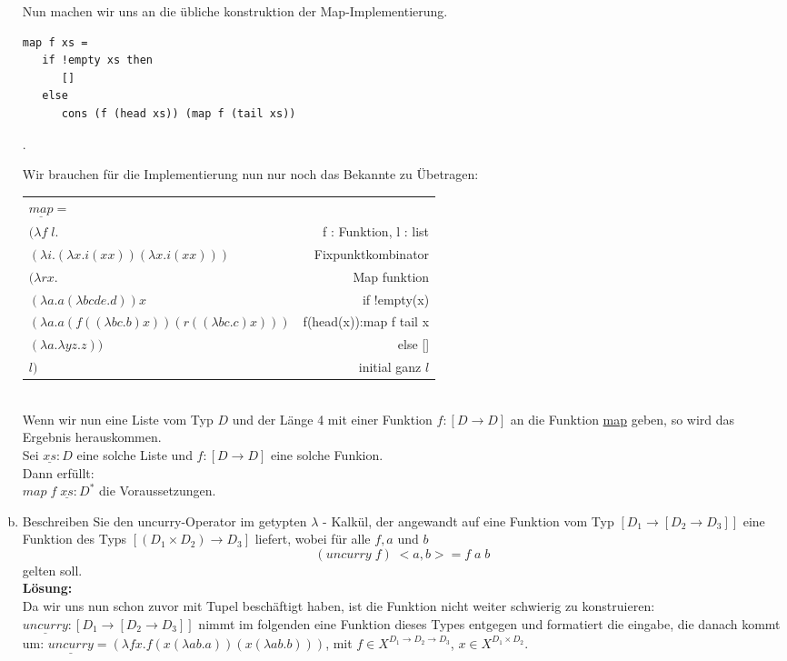 \documentclass[11pt,a4paper,ngerman]{article}
\begin{document}
\begin{enumerate}[(a)]
      Nun machen wir uns an die übliche konstruktion der Map-Implementierung.
      \begin{lstlisting}
map f xs =
   if !empty xs then
      []
   else
      cons (f (head xs)) (map f (tail xs))
      \end{lstlisting}.

      Wir brauchen für die Implementierung nun nur noch das Bekannte zu Übetragen:\\
      \begin{tabular}{lr}
         $\underline{map} =$ &\\
         $ (\lambda f \; l.$& f : Funktion, l : list\\
         $(\lambda i.(\lambda x.i(xx)) (\lambda x.i(xx)))$& Fixpunktkombinator\\   
         $(\lambda rx.$&Map funktion\\
         $(\lambda a.a(\lambda bcde.d))x$& if !empty(x)\\
         $(\lambda a.a (f((\lambda bc.b)x)) (r((\lambda bc.c)x)))$& f(head(x)):map f tail x\\
         $(\lambda a. \lambda yz.z))$& else []\\
         $l)$& initial ganz $l$
      \end{tabular}\\
      
      Wenn wir nun eine Liste vom Typ $D$ und der Länge 4 mit einer Funktion $f:[D\rightarrow D]$
      an die Funktion \underline{map} geben, so wird das Ergebnis herauskommen.\\

      Sei $\underline{xs} : D$ eine solche Liste und $f : [D \rightarrow D]$ eine solche Funkion.\\
      Dann erfüllt:\\
      $map \;f\; \underline{xs} : D^*$ die Voraussetzungen.

\pagebreak

	\item Beschreiben Sie den uncurry-Operator im getypten $\lambda$ - Kalkül, der angewandt
      auf eine Funktion vom Typ $[D_1 \rightarrow [D_2 \rightarrow D_3]]$ eine Funktion des
      Typs $[(D_1 \times D_2) \rightarrow D_3]$ liefert, wobei für alle $f, a$ und $b$
      $$
         (uncurry\; f) \;<a,b> = f \; a \; b 
      $$
      gelten soll.\\
   \textbf{Lösung:}\\
      Da wir uns nun schon zuvor mit Tupel beschäftigt haben, ist die Funktion nicht weiter
      schwierig zu konstruieren:
      $\underline{uncurry} : [D_1 \rightarrow [D_2 \rightarrow D_3]]$
      nimmt im folgenden eine Funktion dieses Types entgegen und formatiert die eingabe,
      die danach kommt um:
      $\underline{uncurry} = (\lambda fx.f (x (\lambda ab.a)) (x (\lambda ab.b)))$,
      mit $f \in X^{D_1 \rightarrow D_2 \rightarrow D_3}$, $x \in X^{D_1 \times D_2}$.\\


\end{enumerate}
\end{document}
